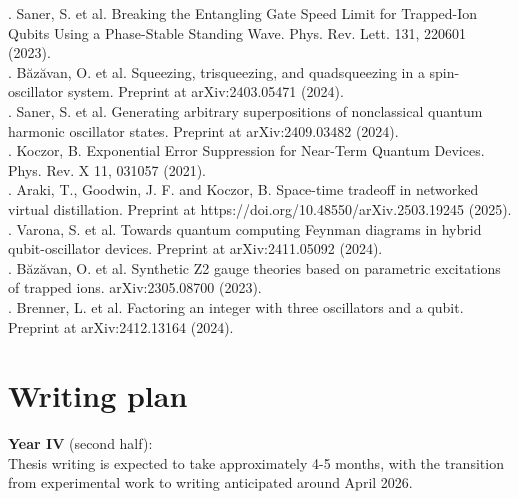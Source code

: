 \documentclass[12pt]{article}
\begin{document}
. Saner, S. et al. Breaking the Entangling Gate Speed Limit for Trapped-Ion Qubits Using a Phase-Stable Standing Wave. Phys. Rev. Lett. 131, 220601 (2023).\\
. Băzăvan, O. et al. Squeezing, trisqueezing, and quadsqueezing in a spin-oscillator system. Preprint at arXiv:2403.05471 (2024).\\
. Saner, S. et al. Generating arbitrary superpositions of nonclassical quantum harmonic oscillator states. Preprint at arXiv:2409.03482 (2024).\\
. Koczor, B. Exponential Error Suppression for Near-Term Quantum Devices. Phys. Rev. X 11, 031057 (2021).\\
. Araki, T., Goodwin, J. F. and Koczor, B. Space-time tradeoff in networked virtual distillation. Preprint at https://doi.org/10.48550/arXiv.2503.19245 (2025).\\
. Varona, S. et al. Towards quantum computing Feynman diagrams in hybrid qubit-oscillator devices. Preprint at arXiv:2411.05092 (2024).\\
. B\u{a}z\u{a}van, O. et al. Synthetic Z2 gauge theories based on parametric excitations of trapped ions. arXiv:2305.08700 (2023).\\
. Brenner, L. et al. Factoring an integer with three oscillators and a qubit. Preprint at arXiv:2412.13164 (2024).\\


\section{Writing plan}
\noindent \textbf{Year IV} (second half): \\
Thesis writing is expected to take approximately 4-5 months, with the transition from experimental work to writing anticipated around April 2026.\\
\end{document}
